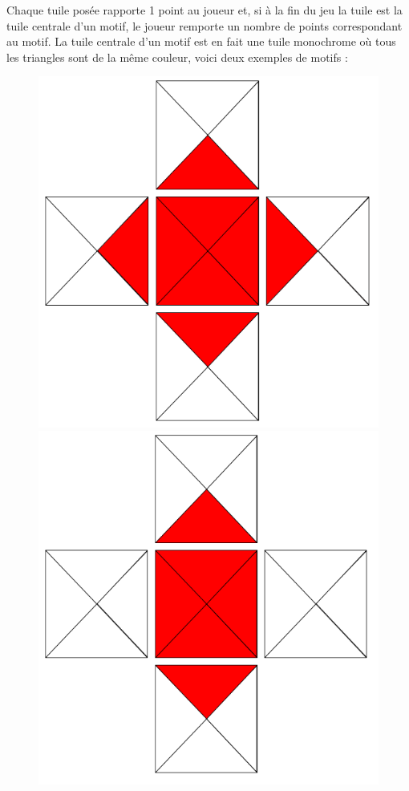 \documentclass[11pt]{article}
\begin{document}
Chaque tuile posée rapporte 1 point au joueur et, si à la fin du jeu la tuile est la tuile centrale d'un motif, le joueur remporte un nombre de points correspondant au motif. La tuile centrale d'un motif est en fait une tuile monochrome où tous les triangles sont de la même couleur, voici deux exemples de motifs : 
\begin{figure}[H]
    \begin{minipage}[b]{0.40\linewidth}
        \centering \includegraphics[scale=0.2]{Motif 34 points.png}
    \end{minipage} \hfill
    \begin{minipage}[b]{0.40\linewidth}
        \centering \includegraphics[scale=0.2]{Motif 20 points.png}

\end{minipage}
\end{figure}
\end{document}
